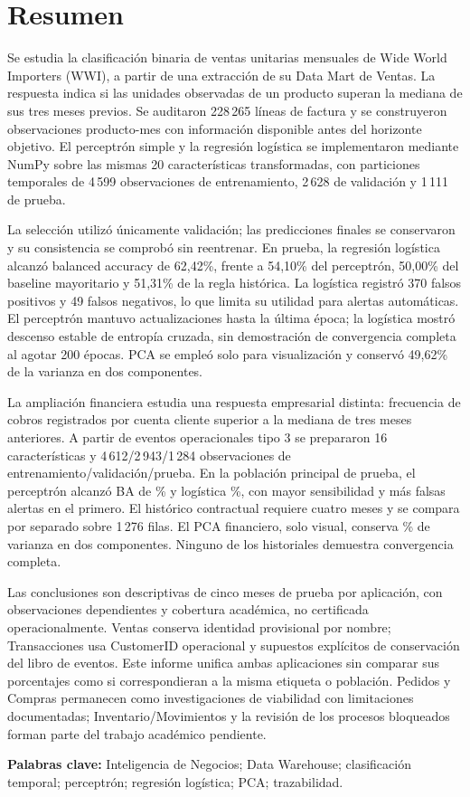 \section*{Resumen}
Se estudia la clasificación binaria de ventas unitarias mensuales de Wide World Importers (WWI), a partir de una extracción de su Data Mart de Ventas. La respuesta indica si las unidades observadas de un producto superan la mediana de sus tres meses previos. Se auditaron 228\,265 líneas de factura y se construyeron observaciones producto-mes con información disponible antes del horizonte objetivo. El perceptrón simple y la regresión logística se implementaron mediante NumPy sobre las mismas 20 características transformadas, con particiones temporales de 4\,599 observaciones de entrenamiento, 2\,628 de validación y 1\,111 de prueba.

La selección utilizó únicamente validación; las predicciones finales se conservaron y su consistencia se comprobó sin reentrenar. En prueba, la regresión logística alcanzó balanced accuracy de 62,42\%, frente a 54,10\% del perceptrón, 50,00\% del baseline mayoritario y 51,31\% de la regla histórica. La logística registró 370 falsos positivos y 49 falsos negativos, lo que limita su utilidad para alertas automáticas. El perceptrón mantuvo actualizaciones hasta la última época; la logística mostró descenso estable de entropía cruzada, sin demostración de convergencia completa al agotar 200 épocas. PCA se empleó solo para visualización y conservó 49,62\% de la varianza en dos componentes.

La ampliación financiera estudia una respuesta empresarial distinta: frecuencia de cobros registrados por cuenta cliente superior a la mediana de tres meses anteriores. A partir de eventos operacionales tipo 3 se prepararon 16 características y 4\,612/2\,943/1\,284 observaciones de entrenamiento/validación/prueba. En la población principal de prueba, el perceptrón alcanzó BA de \TFBAPTest\% y logística \TFBALTest\%, con mayor sensibilidad y más falsas alertas en el primero. El histórico contractual requiere cuatro meses y se compara por separado sobre 1\,276 filas. El PCA financiero, solo visual, conserva \TFPCARetenida\% de varianza en dos componentes. Ninguno de los historiales demuestra convergencia completa.

Las conclusiones son descriptivas de cinco meses de prueba por aplicación, con observaciones dependientes y cobertura académica, no certificada operacionalmente. Ventas conserva identidad provisional por nombre; Transacciones usa CustomerID operacional y supuestos explícitos de conservación del libro de eventos. Este informe unifica ambas aplicaciones sin comparar sus porcentajes como si correspondieran a la misma etiqueta o población. Pedidos y Compras permanecen como investigaciones de viabilidad con limitaciones documentadas; Inventario/Movimientos y la revisión de los procesos bloqueados forman parte del trabajo académico pendiente.

\noindent\textbf{Palabras clave:} Inteligencia de Negocios; Data Warehouse; clasificación temporal; perceptrón; regresión logística; PCA; trazabilidad.
